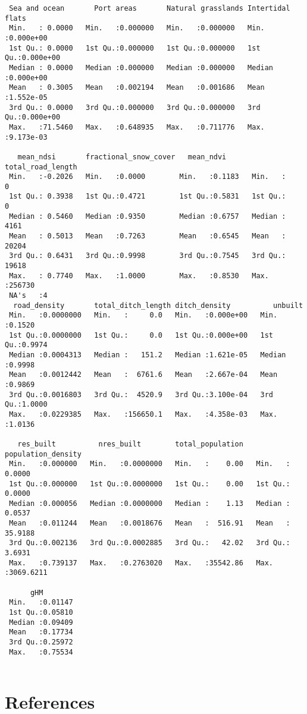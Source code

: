 \documentclass[
]{article}
\begin{document}
\begin{verbatim}
 Sea and ocean       Port areas       Natural grasslands Intertidal flats   
 Min.   : 0.0000   Min.   :0.000000   Min.   :0.000000   Min.   :0.000e+00  
 1st Qu.: 0.0000   1st Qu.:0.000000   1st Qu.:0.000000   1st Qu.:0.000e+00  
 Median : 0.0000   Median :0.000000   Median :0.000000   Median :0.000e+00  
 Mean   : 0.3005   Mean   :0.002194   Mean   :0.001686   Mean   :1.552e-05  
 3rd Qu.: 0.0000   3rd Qu.:0.000000   3rd Qu.:0.000000   3rd Qu.:0.000e+00  
 Max.   :71.5460   Max.   :0.648935   Max.   :0.711776   Max.   :9.173e-03  
                                                                            
   mean_ndsi       fractional_snow_cover   mean_ndvi      total_road_length
 Min.   :-0.2026   Min.   :0.0000        Min.   :0.1183   Min.   :     0   
 1st Qu.: 0.3938   1st Qu.:0.4721        1st Qu.:0.5831   1st Qu.:     0   
 Median : 0.5460   Median :0.9350        Median :0.6757   Median :  4161   
 Mean   : 0.5013   Mean   :0.7263        Mean   :0.6545   Mean   : 20204   
 3rd Qu.: 0.6431   3rd Qu.:0.9998        3rd Qu.:0.7545   3rd Qu.: 19618   
 Max.   : 0.7740   Max.   :1.0000        Max.   :0.8530   Max.   :256730   
 NA's   :4                                                                 
  road_density       total_ditch_length ditch_density          unbuilt      
 Min.   :0.0000000   Min.   :     0.0   Min.   :0.000e+00   Min.   :0.1520  
 1st Qu.:0.0000000   1st Qu.:     0.0   1st Qu.:0.000e+00   1st Qu.:0.9974  
 Median :0.0004313   Median :   151.2   Median :1.621e-05   Median :0.9998  
 Mean   :0.0012442   Mean   :  6761.6   Mean   :2.667e-04   Mean   :0.9869  
 3rd Qu.:0.0016803   3rd Qu.:  4520.9   3rd Qu.:3.100e-04   3rd Qu.:1.0000  
 Max.   :0.0229385   Max.   :156650.1   Max.   :4.358e-03   Max.   :1.0136  
                                                                            
   res_built          nres_built        total_population   population_density 
 Min.   :0.000000   Min.   :0.0000000   Min.   :    0.00   Min.   :   0.0000  
 1st Qu.:0.000000   1st Qu.:0.0000000   1st Qu.:    0.00   1st Qu.:   0.0000  
 Median :0.000056   Median :0.0000000   Median :    1.13   Median :   0.0537  
 Mean   :0.011244   Mean   :0.0018676   Mean   :  516.91   Mean   :  35.9188  
 3rd Qu.:0.002136   3rd Qu.:0.0002885   3rd Qu.:   42.02   3rd Qu.:   3.6931  
 Max.   :0.739137   Max.   :0.2763020   Max.   :35542.86   Max.   :3069.6211  
                                                                              
      gHM         
 Min.   :0.01147  
 1st Qu.:0.05810  
 Median :0.09409  
 Mean   :0.17734  
 3rd Qu.:0.25972  
 Max.   :0.75534  
                  
\end{verbatim}

\hypertarget{references}{%
\section{References}\label{references}}

\renewcommand{\bibsection}{}

\end{document}
